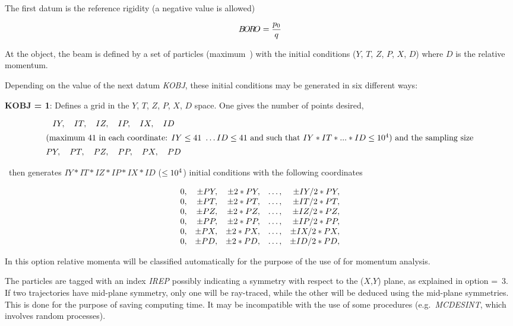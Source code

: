 \noindent The first datum is the reference rigidity (a negative value is 
allowed)
 
$$ B\!O\!R\!O = \dfrac{p_0 }{ q}  $$

\noindent At the object, the beam is defined by a set of particles (maximum~\imax) with 
the initial conditions ($ Y$, $T$, $Z$, $P$, $X$, $D$)  where $ D $ 
is the relative momentum. 

\noindent Depending on the value of the next datum \textsl{KOBJ}, these initial
conditions may be generated   in six different ways:   
\bigskip

\noindent\textbf{KOBJ  =  1}:  Defines a grid in the $ Y$, $T$, $Z$, $P$, $X$, $D$
 space. One gives the number of points desired,
 
 \begin{gather*}
	 IY,\quad IT,\quad IZ,\quad IP, \quad IX, \quad ID\\
\intertext{(maximum \ensuremath{41}\ in each coordinate: $ IY\leq 41\ \ldots ID\leq 41$ and 
such that $ IY * IT * ... * ID\leq 10^4$) and the
		sampling size} 
	 PY,\quad PT,\quad PZ,\quad PP,\quad PX, \quad PD  
 \end{gather*}


\noindent\zgou\  then generates 
$ IY  \ast  IT  \ast  IZ \ast   IP \ast IX \ast  ID $ ($\leq  10^4$) initial conditions with the 
following coordinates

$$
  \begin{array}{*{5}{r<{,}}}
	  0  &  \pm PY &   \pm 2  \ast   PY & \ldots & \pm IY/2  \ast   PY \\
	  0  &  \pm PT &   \pm 2 \ast   PT  & \ldots &  \pm IT/2  \ast   PT \\
	  0  &  \pm PZ &   \pm 2 \ast  PZ   & \ldots &  \pm IZ/2 \ast PZ \\
	  0  &  \pm PP &   \pm 2  \ast PP  & \ldots  &  \pm IP/2  \ast  PP \\
	  0  &  \pm PX &   \pm 2  \ast  PX & \ldots  &  \pm IX/2 \ast   PX \\
 	  0  &  \pm PD &   \pm 2  \ast  PD & \ldots  &  \pm ID/2 \ast   PD 
 \end{array}
 $$

\noindent In this option relative momenta will be classified automatically for
the purpose of the use of \IMAGES{} for momentum analysis.


\noindent The particles are tagged with an index \textsl{IREP} possibly
indicating a symmetry with respect to the ($ X$,$Y$) plane, as explained in option 
\mbox{\KOBJ= 3}. If two trajectories have mid-plane symmetry, only one  will be 
ray-traced, while the other will be deduced using the mid-plane 
symmetries. This is done for the purpose of saving computing time. It may 
be incompatible with the use of some procedures (e.g.~\textsl{MCDESINT}, which 
involves random processes). 

